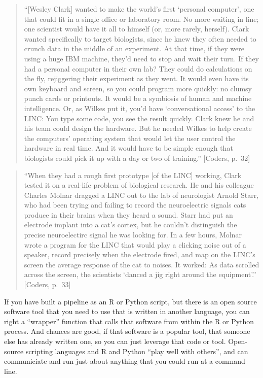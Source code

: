 \documentclass[]{tufte-book}
\begin{document}
\begin{quote}
``{[}Wesley Clark{]} wanted to make the world's first `personal computer', one that
could fit in a single office or laboratory room. No more waiting in line; one
scientist would have it all to himself (or, more rarely, herself). Clark wanted
specifically to target biologists, since he knew they often needed to crunch
data in the middle of an experiment. At that time, if they were using a huge IBM
machine, they'd need to stop and wait their turn. If they had a personal
computer in their own lab? They could do calculations on the fly, rejiggering
their experiment as they went. It would even have its own keyboard and screen,
so you could program more quickly: no clumsy punch cards or printouts. It would
be a symbiosis of human and machine intelligence. Or, as Wilkes put it, you'd
have `conversational access' to the LINC: You type some code, you see the result
quickly. Clark knew he and his team could design the hardware. But he needed
Wilkes to help create the computers' operating system that would let the user
control the hardware in real time. And it would have to be simple enough that
biologists could pick it up with a day or two of training.'' {[}Coders, p.~32{]}
\end{quote}

\begin{quote}
``When they had a rough first prototype {[}of the LINC{]} working, Clark tested
it on a real-life problem of biological research. He and his colleague
Charles Molnar dragged a LINC out to the lab of neurologist Arnold Starr, who
had been trying and failing to record the neuroelectric signals cats produce
in their brains when they heard a sound. Starr had put an electrode implant
into a cat's cortex, but he couldn't distinguish the precise neuroelectirc
signal he was looking for. In a few hours, Molnar wrote a program for the
LINC that would play a clicking noise out of a speaker, record precisely
when the electrode fired, and map on the LINC's screen the average response
of the cat to noises. It worked: As data scrolled across the screen, the
scientists `danced a jig right around the equipment'.'' {[}Coders, p.~33{]}
\end{quote}

If you have built a pipeline as an R or Python script, but there is an open source software
tool that you need to use that is written in another language, you can right a ``wrapper''
function that calls that software from within the R or Python process. And chances are good,
if that software is a popular tool, that someone else has already written one, so you can
just leverage that code or tool. Open-source scripting languages and R and Python ``play
well with others'', and can communiciate and run just about anything that you could run at
a command line.
\end{document}

